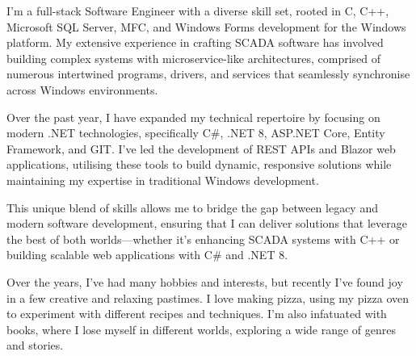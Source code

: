 \documentclass[9pt]{developercv} %
\begin{document}
\begin{minipage}[t]{1\textwidth} %


	I’m a full-stack Software Engineer with a diverse skill set, rooted in C, C++, Microsoft SQL Server, MFC, and Windows Forms development for the Windows platform. My extensive experience in crafting SCADA software has involved building complex systems with microservice-like architectures, comprised of numerous intertwined programs, drivers, and services that seamlessly synchronise across Windows environments.

	\vspace{0.5cm}

	Over the past year, I have expanded my technical repertoire by focusing on modern .NET technologies, specifically C\#, .NET 8, ASP.NET Core, Entity Framework, and GIT. I’ve led the development of REST APIs and Blazor web applications, utilising these tools to build dynamic, responsive solutions while maintaining my expertise in traditional Windows development.

	\vspace{0.5cm}
	
	This unique blend of skills allows me to bridge the gap between legacy and modern software development, ensuring that I can deliver solutions that leverage the best of both worlds—whether it’s enhancing SCADA systems with C++ or building scalable web applications with C\# and .NET 8.

	\vspace{0.5cm}

	Over the years, I’ve had many hobbies and interests, but recently I’ve found joy in a few creative and relaxing pastimes. I love making pizza, using my pizza oven to experiment with different recipes and techniques. I’m also infatuated with books, where I lose myself in different worlds, exploring a wide range of genres and stories.

\end{minipage}

\vspace{1cm}	



\end{document}
